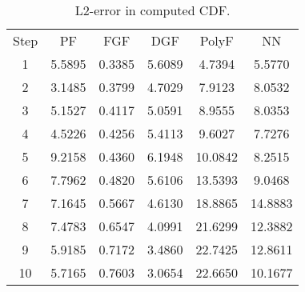 \begin{table}
\caption{L2-error in computed CDF.}	
\begin{center}
\begin{tabular}{ | c || c | c | c | c | c | }
Step & PF & FGF & DGF & PolyF & NN \\
1 & 5.5895 & 0.3385 & 5.6089 & 4.7394 & 5.5770 \\  
2 & 3.1485 & 0.3799 & 4.7029 & 7.9123 & 8.0532 \\  
3 & 5.1527 & 0.4117 & 5.0591 & 8.9555 & 8.0353 \\  
4 & 4.5226 & 0.4256 & 5.4113 & 9.6027 & 7.7276 \\  
5 & 9.2158 & 0.4360 & 6.1948 & 10.0842 & 8.2515 \\  
6 & 7.7962 & 0.4820 & 5.6106 & 13.5393 & 9.0468 \\  
7 & 7.1645 & 0.5667 & 4.6130 & 18.8865 & 14.8883 \\  
8 & 7.4783 & 0.6547 & 4.0991 & 21.6299 & 12.3882 \\  
9 & 5.9185 & 0.7172 & 3.4860 & 22.7425 & 12.8611 \\  
10 & 5.7165 & 0.7603 & 3.0654 & 22.6650 & 10.1677 
\end{tabular}
\end{center}
\end{table}